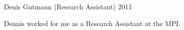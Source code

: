 \documentclass[10pt]{article}
\makeatletter
\newlength{\bibhang}
\newlength{\bibsep}
 {\@listi \global\bibsep\itemsep \global\advance\bibsep by\parsep}
\newenvironment{bibsection}%
        {\vspace{-\baselineskip}\begin{list}{}{%
       \setlength{\leftmargin}{\bibhang}%
       \setlength{\itemindent}{-\leftmargin}%
       \setlength{\itemsep}{\bibsep}%
       \setlength{\parsep}{\z@}%
        \setlength{\partopsep}{0pt}%
        \setlength{\topsep}{0pt}}}
        {\end{list}\vspace{-.6\baselineskip}}
\newenvironment{outerlist}[1][\enskip\textbullet]%
        {\begin{itemize}[#1]}{\end{itemize}%
         \vspace{-.6\baselineskip}}
\newenvironment{innerlist}[1][\enskip\textbullet]%
        {\begin{compactitem}[#1]}{\end{compactitem}}
\makeatother
\begin{document}
\begin{bibsection}
\begin{outerlist}
\item[]Denis Gutmann (Research Assistant) \hfill{2011}
\begin{innerlist}\item Dennis worked for me as a Research Assistant at the MPI.\end{innerlist}
\end{outerlist}


\end{bibsection}
\end{document}
